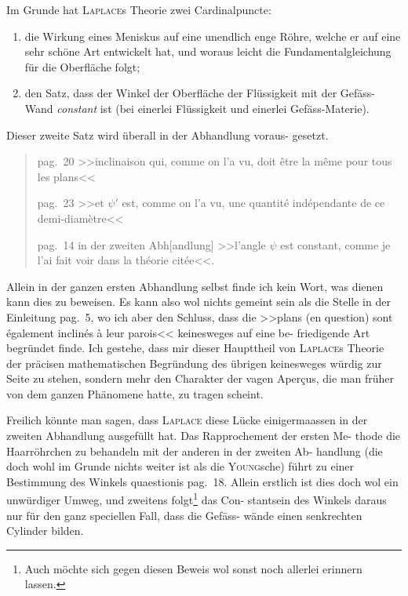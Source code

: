 \documentclass[12pt,a4paper]{article}
\theoremstyle{plain}
\theoremstyle{definition}
\theoremstyle{remark}
\begin{document}
Im Grunde hat \textsc{Laplace}s Theorie zwei Cardinalpuncte:

\begin{enumerate}[label=\arabic*)]
\item die Wirkung eines Meniskus auf eine unendlich enge R\"ohre, welche
er auf eine sehr sch\"one Art entwickelt hat, und woraus leicht die
Fundamentalgleichung f\"ur die Oberfl\"ache folgt;

\item den Satz, dass der Winkel der Oberfl\"ache der Fl\"ussigkeit
mit der Gef\"ass-Wand \textit{constant} ist (bei einerlei Fl\"ussigkeit
und einerlei Gef\"ass-Materie).
\end{enumerate}

Dieser zweite Satz wird \"uberall in der Abhandlung voraus-
gesetzt.

\begin{quote}
pag.~20 >>inclinaison qui, comme on l'a vu, doit \^etre la m\^eme pour
tous les plans<<

pag.~23 >>et $\psi'$ est, comme on l'a vu, une quantit\'e ind\'ependante de ce
demi-diam\`etre<<

pag.~14 in der zweiten Abh[andlung] >>l'angle $\psi$ est constant, comme je
l'ai fait voir dans la th\'eorie cit\'ee<<.
\end{quote}

Allein in der ganzen ersten Abhandlung selbst finde ich kein Wort, was
dienen kann dies zu beweisen. Es kann also wol nichts gemeint sein als
die Stelle in der Einleitung pag.~5, wo ich aber den Schluss, dass die >>plans
(en question) sont \'egalement inclin\'es \`a leur parois<< keinesweges auf eine be-
friedigende Art begr\"undet finde. Ich gestehe, dass mir dieser Haupttheil
von \textsc{Laplace}s Theorie der pr\"acisen mathematischen Begr\"undung des \"ubrigen
keinesweges w\"urdig zur Seite zu stehen, sondern mehr den Charakter der vagen
Aper\c{c}us, die man fr\"uher von dem ganzen Ph\"anomene hatte, zu tragen scheint.

Freilich k\"onnte man sagen, dass \textsc{Laplace} diese L\"ucke einigermaassen in
der zweiten Abhandlung ausgef\"ullt hat. Das Rapprochement der ersten Me-
thode die Haarr\"ohrchen zu behandeln mit der anderen in der zweiten Ab-
handlung (die doch wohl im Grunde nichts weiter ist als die \textsc{Young}sche)
f\"uhrt zu einer Bestimmung des Winkels quaestionis pag.~18. Allein erstlich
ist dies doch wol ein unw\"urdiger Umweg, und zweitens folgt\footnote{Auch m\"ochte sich gegen diesen Beweis wol sonst noch allerlei erinnern lassen.} das Con-
stantsein des Winkels daraus nur f\"ur den ganz speciellen Fall, dass die Gef\"ass-
w\"ande einen senkrechten Cylinder bilden.
\end{document}
